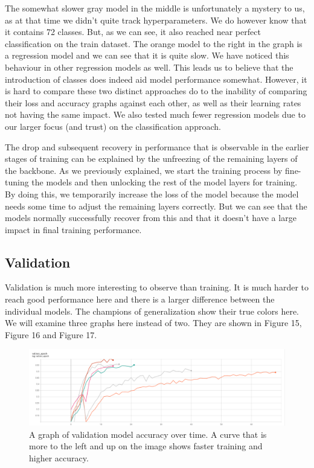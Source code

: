 \documentclass[]{article}
\begin{document}
The somewhat slower gray model in the middle is unfortunately a mystery
to us, as at that time we didn't quite track hyperparameters. We do
however know that it contains 72 classes. But, as we can see, it also
reached near perfect classification on the train dataset. The orange
model to the right in the graph is a regression model and we can see
that it is quite slow. We have noticed this behaviour in other
regression models as well. This leads us to believe that the
introduction of classes does indeed aid model performance somewhat.
However, it is hard to compare these two distinct approaches do to the
inability of comparing their loss and accuracy graphs against each
other, as well as their learning rates not having the same impact. We
also tested much fewer regression models due to our larger focus (and
trust) on the classification approach.

The drop and subsequent recovery in performance that is observable in
the earlier stages of training can be explained by the unfreezing of the
remaining layers of the backbone. As we previously explained, we start
the training process by fine-tuning the models and then unlocking the
rest of the model layers for training. By doing this, we temporarily
increase the loss of the model because the model needs some time to
adjust the remaining layers correctly. But we can see that the models
normally successfully recover from this and that it doesn't have a large
impact in final training performance.

\hypertarget{validation-1}{%
\subsection{Validation}\label{validation-1}}

Validation is much more interesting to observe than training. It is much
harder to reach good performance here and there is a larger difference
between the individual models. The champions of generalization show
their true colors here. We will examine three graphs here instead of
two. They are shown in Figure 15, Figure 16 and Figure 17.

\begin{figure}
\centering
\includegraphics[width=1\textwidth,height=\textheight]{./tex2pdf.-3ffa51a14b505aec/a48aa4f902d939b0a1445e1d557222bfc1eab059.png}
\caption{A graph of validation model accuracy over time. A curve that is
more to the left and up on the image shows faster training and higher
accuracy.}
\end{figure}
\end{document}
